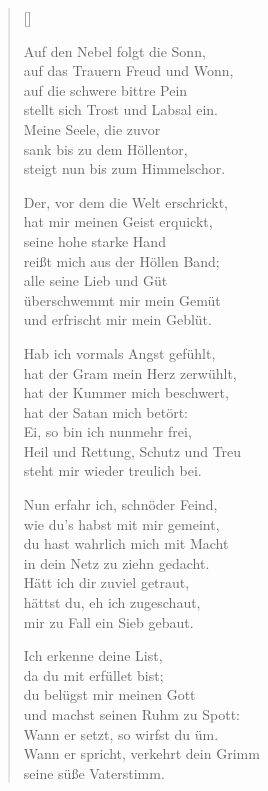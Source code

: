 \begin{multicols}{2}
\settowidth{\versewidth}{Der, vor dem die Welt erschrickt,}
\begin{verse}[\versewidth]

 Auf den Nebel folgt die Sonn,\\
auf das Trauern Freud und Wonn,\\
auf die schwere bittre Pein\\
stellt sich Trost und Labsal ein.\\
Meine Seele, die zuvor\\
sank bis zu dem Höllentor,\\
steigt nun bis zum Himmelschor.

 Der, vor dem die Welt erschrickt,\\
hat mir meinen Geist erquickt,\\
seine hohe starke Hand\\
reißt mich aus der Höllen Band;\\
alle seine Lieb und Güt\\
überschwemmt mir mein Gemüt\\
und erfrischt mir mein Geblüt.

 Hab ich vormals Angst gefühlt,\\
hat der Gram mein Herz zerwühlt,\\
hat der Kummer mich beschwert,\\
hat der Satan mich betört:\\
Ei, so bin ich nunmehr frei,\\
Heil und Rettung, Schutz und Treu\\
steht mir wieder treulich bei.

 Nun erfahr ich, schnöder Feind,\\
wie du's habst mit mir gemeint,\\
du hast wahrlich mich mit Macht\\
in dein Netz zu ziehn gedacht.\\
Hätt ich dir zuviel getraut,\\
hättst du, eh ich zugeschaut,\\
mir zu Fall ein Sieb gebaut.

 Ich erkenne deine List,\\
da du mit erfüllet bist;\\
du belügst mir meinen Gott\\
und machst seinen Ruhm zu Spott:\\
Wann er setzt, so wirfst du üm.\\
Wann er spricht, verkehrt dein Grimm\\
seine süße Vaterstimm.


\end{verse}
\end{multicols}
